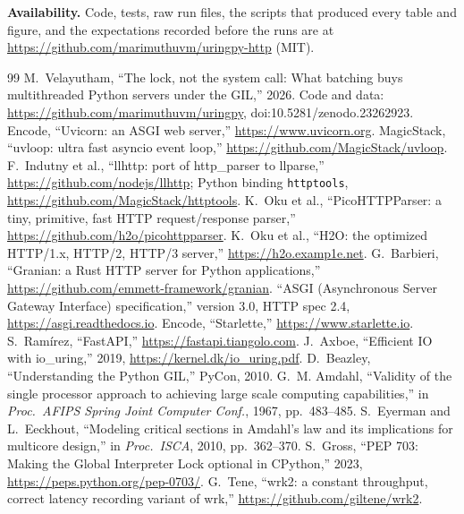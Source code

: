 \documentclass[10pt,twocolumn,letterpaper]{article}
\newcommand{\code}[1]{\texttt{#1}}
\begin{document}
\textbf{Availability.} Code, tests, raw run files, the scripts that produced
every table and figure, and the expectations recorded before the runs are
at \url{https://github.com/marimuthuvm/uringpy-http} (MIT).

\footnotesize
\begin{thebibliography}{99}
\setlength{\itemsep}{0pt}
 M.~Velayutham, ``The lock, not the system call: What batching buys multithreaded Python servers under the GIL,'' 2026. Code and data: \url{https://github.com/marimuthuvm/uringpy}, doi:10.5281/zenodo.23262923.
 Encode, ``Uvicorn: an ASGI web server,'' \url{https://www.uvicorn.org}.
 MagicStack, ``uvloop: ultra fast asyncio event loop,'' \url{https://github.com/MagicStack/uvloop}.
 F.~Indutny et al., ``llhttp: port of http\_parser to llparse,'' \url{https://github.com/nodejs/llhttp}; Python binding \code{httptools}, \url{https://github.com/MagicStack/httptools}.
 K.~Oku et al., ``PicoHTTPParser: a tiny, primitive, fast HTTP request/response parser,'' \url{https://github.com/h2o/picohttpparser}.
 K.~Oku et al., ``H2O: the optimized HTTP/1.x, HTTP/2, HTTP/3 server,'' \url{https://h2o.examp1e.net}.
 G.~Barbieri, ``Granian: a Rust HTTP server for Python applications,'' \url{https://github.com/emmett-framework/granian}.
 ``ASGI (Asynchronous Server Gateway Interface) specification,'' version 3.0, HTTP spec 2.4, \url{https://asgi.readthedocs.io}.
 Encode, ``Starlette,'' \url{https://www.starlette.io}.
 S.~Ram\'irez, ``FastAPI,'' \url{https://fastapi.tiangolo.com}.
 J.~Axboe, ``Efficient IO with io\_uring,'' 2019, \url{https://kernel.dk/io_uring.pdf}.
 D.~Beazley, ``Understanding the Python GIL,'' PyCon, 2010.
 G.~M. Amdahl, ``Validity of the single processor approach to achieving large scale computing capabilities,'' in \emph{Proc.\ AFIPS Spring Joint Computer Conf.}, 1967, pp.~483--485.
 S.~Eyerman and L.~Eeckhout, ``Modeling critical sections in Amdahl's law and its implications for multicore design,'' in \emph{Proc.\ ISCA}, 2010, pp.~362--370.
 S.~Gross, ``PEP 703: Making the Global Interpreter Lock optional in CPython,'' 2023, \url{https://peps.python.org/pep-0703/}.
 G.~Tene, ``wrk2: a constant throughput, correct latency recording variant of wrk,'' \url{https://github.com/giltene/wrk2}.
\end{thebibliography}
\end{document}

